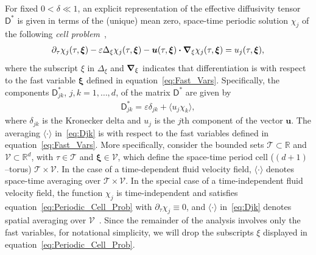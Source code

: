 \documentclass[leqno,onefignum,onetabnum]{siamltex1213}
\newcommand{\Tc}{\mathcal{T}}
\newcommand{\Vc}{\mathcal{V}}
\newcommand{\Dm}{\mathsf{D}}
\newcommand\bnabla{\mbox{\boldmath${\nabla}$}}
\providecommand\bcdot{\boldsymbol{\cdot}}
\newcommand{\vecu}{\boldsymbol{u}}
\newcommand{\vecxi}{\boldsymbol{\xi}}
\begin{document}
For fixed $0<\delta\ll1$, an explicit representation of the
effective diffusivity tensor $\Dm^*$ is given in terms of the (unique)
mean zero, space-time periodic solution $\chi_j$ of the following
\emph{cell problem}~\cite{Biferale:PF:2725,Majda:Kramer:1999:book}, 
%
\begin{align}\label{eq:Periodic_Cell_Prob}
  \partial_\tau\chi_j(\tau,\vecxi)
  -\varepsilon\Delta_\xi\chi_j(\tau,\vecxi)
  -\vecu(\tau,\vecxi) \bcdot\bnabla_\xi \chi_j(\tau,\vecxi)
  =u_j(\tau,\vecxi),
\end{align}
%
where the subscript $\xi$ in $\Delta_\xi$ and $\bnabla_\xi$
indicates that differentiation is with respect to the fast variable
$\vecxi$ defined in equation~\eqref{eq:Fast_Vars}. Specifically,
the components $\Dm^*_{jk}$, $j,k=1,\ldots,d$, of the matrix $\Dm^*$ are given
by~\cite{McLaughlin:SIAM_JAM:780,Fannjiang:1994:SIAM_JAM:333,Novikov:2005:CPAM:867,Majda:Kramer:1999:book}          
%
\begin{align}\label{eq:Djk}
  \Dm^*_{jk}=\varepsilon\delta_{jk}+\langle u_j\chi_k\rangle,
\end{align}
%
where $\delta_{jk}$ is the Kronecker delta and $u_j$ is the $j$th component
of the vector $\vecu$. The averaging $\langle\cdot\rangle$ in~\eqref{eq:Djk} is with
respect to the fast variables defined in
equation~\eqref{eq:Fast_Vars}. More specifically, consider the bounded
sets  $\Tc\subset\mathbb{R}$ and $\Vc\subset\mathbb{R}^d$, with $\tau\in\Tc$ and
$\vecxi\in\Vc$, which define the space-time period cell ($(d+1)$--torus)
$\Tc\times\Vc$. In the case of a time-dependent fluid velocity field, $\langle\cdot\rangle$
denotes space-time averaging over $\Tc\times\Vc$. In the special case of a
time-independent fluid velocity field, the function $\chi_j$ is
time-independent and satisfies equation~\eqref{eq:Periodic_Cell_Prob}
with $\partial_\tau\chi_j\equiv0$, and $\langle\cdot\rangle$ in~\eqref{eq:Djk} denotes spatial averaging over
$\Vc$~\cite{Fannjiang:1994:SIAM_JAM:333,Novikov:2005:CPAM:867,Majda:Kramer:1999:book}. Since
the remainder of the analysis involves only the fast variables, for
notational simplicity, we will drop the subscripts $\xi$ displayed in
equation~\eqref{eq:Periodic_Cell_Prob}. 
\end{document}
